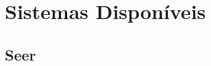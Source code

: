\begin{adjustwidth}{-1cm}{0cm}
    
\end{adjustwidth}

\section{Sistemas Disponíveis}
\label{sec:systems_available}

\subsection{Seer}
\label{sec:seer}